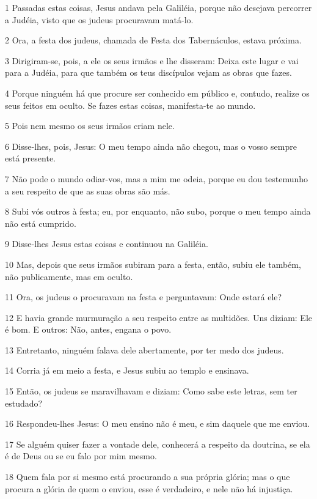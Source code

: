 \par 1 Passadas estas coisas, Jesus andava pela Galiléia, porque não desejava percorrer a Judéia, visto que os judeus procuravam matá-lo.
\par 2 Ora, a festa dos judeus, chamada de Festa dos Tabernáculos, estava próxima.
\par 3 Dirigiram-se, pois, a ele os seus irmãos e lhe disseram: Deixa este lugar e vai para a Judéia, para que também os teus discípulos vejam as obras que fazes.
\par 4 Porque ninguém há que procure ser conhecido em público e, contudo, realize os seus feitos em oculto. Se fazes estas coisas, manifesta-te ao mundo.
\par 5 Pois nem mesmo os seus irmãos criam nele.
\par 6 Disse-lhes, pois, Jesus: O meu tempo ainda não chegou, mas o vosso sempre está presente.
\par 7 Não pode o mundo odiar-vos, mas a mim me odeia, porque eu dou testemunho a seu respeito de que as suas obras são más.
\par 8 Subi vós outros à festa; eu, por enquanto, não subo, porque o meu tempo ainda não está cumprido.
\par 9 Disse-lhes Jesus estas coisas e continuou na Galiléia.
\par 10 Mas, depois que seus irmãos subiram para a festa, então, subiu ele também, não publicamente, mas em oculto.
\par 11 Ora, os judeus o procuravam na festa e perguntavam: Onde estará ele?
\par 12 E havia grande murmuração a seu respeito entre as multidões. Uns diziam: Ele é bom. E outros: Não, antes, engana o povo.
\par 13 Entretanto, ninguém falava dele abertamente, por ter medo dos judeus.
\par 14 Corria já em meio a festa, e Jesus subiu ao templo e ensinava.
\par 15 Então, os judeus se maravilhavam e diziam: Como sabe este letras, sem ter estudado?
\par 16 Respondeu-lhes Jesus: O meu ensino não é meu, e sim daquele que me enviou.
\par 17 Se alguém quiser fazer a vontade dele, conhecerá a respeito da doutrina, se ela é de Deus ou se eu falo por mim mesmo.
\par 18 Quem fala por si mesmo está procurando a sua própria glória; mas o que procura a glória de quem o enviou, esse é verdadeiro, e nele não há injustiça.

